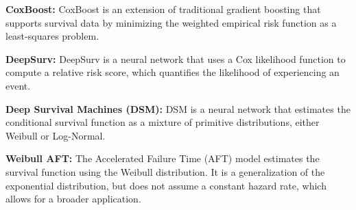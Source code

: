 \documentclass[letterpaper]{article} %
\begin{document}
\textbf{CoxBoost:} \cite{hothorn_survival_2005} CoxBoost is an extension of traditional gradient boosting that supports survival data by minimizing the weighted empirical risk function as a least-squares problem.

\textbf{DeepSurv:} \cite{katzman_deepsurv_2018} DeepSurv is a neural network that uses a Cox likelihood function to compute a relative risk score, which quantifies the likelihood of experiencing an event.

\textbf{Deep Survival Machines (DSM):} \cite{nagpal_deep_2021} DSM is a neural network that estimates the conditional survival function as a mixture of primitive distributions, either Weibull or Log-Normal.

\textbf{Weibull AFT:} \cite{lee_statistical_2013} The Accelerated Failure Time (AFT) model estimates the survival function using the Weibull distribution. It is a generalization of the exponential distribution, but does not assume a constant hazard rate, which allows for a broader application.



\end{document}
